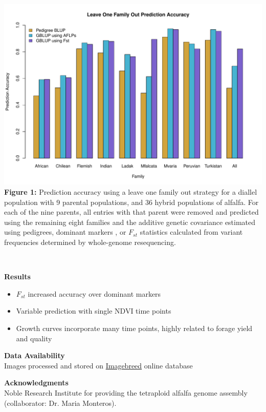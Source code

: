 \documentclass[10pt, letterpaper]{article}
\begin{document}
\begin{minipage}{0.6\linewidth}%
\includegraphics[width = \linewidth]{FstLeaveOneFamOutPredAcc} \\
\textbf{Figure 1:} Prediction accuracy using a leave one family out strategy for a diallel population with 9 parental populations, and 36 hybrid populations of alfalfa. For each of the nine parents, all entries with that parent were removed and predicted using the remaining eight families and the additive genetic covariance estimated using pedigrees, dominant markers \parencite[1544 AFLPs;][]{segovia2003}, or $F_{st}$ statistics calculated from variant frequencies determined by whole-genome resequencing.
\end{minipage}%
\begin{minipage}{0.05\linewidth}
\
\end{minipage}%
\begin{minipage}{0.35\linewidth}

\large{\textbf{Results}}
\raggedright{
\noindent \begin{itemize}
	\item $F_{st}$ increased accuracy over dominant markers
	\item Variable prediction with single NDVI time points
	\item Growth curves incorporate many time points, highly related to forage yield and quality 

\end{itemize}
}

\large{\textbf{Data Availability}}\\
Images processed and stored on \href{https://www.imagebreed.org/}{Imagebreed} online database \parencite{morales2020}

\vspace{5mm}
\large{\textbf{Acknowledgments}}\\
Noble Research Institute for providing the tetraploid alfalfa genome assembly (collaborator: Dr. Maria Monteros).

\end{minipage}%
\end{document}
